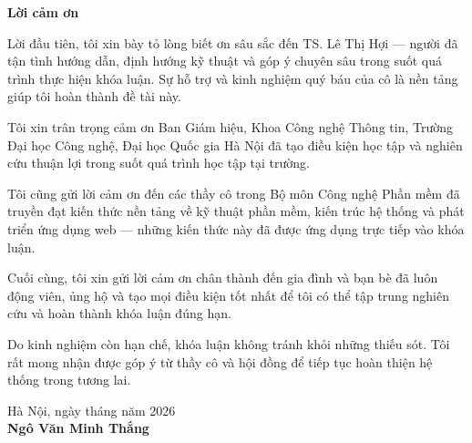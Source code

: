 \begin{center}
\textbf{\large{Lời cảm ơn}}
\end{center}

Lời đầu tiên, tôi xin bày tỏ lòng biết ơn sâu sắc đến TS. Lê Thị Hợi — người đã tận tình hướng dẫn, định hướng kỹ thuật và góp ý chuyên sâu trong suốt quá trình thực hiện khóa luận. Sự hỗ trợ và kinh nghiệm quý báu của cô là nền tảng giúp tôi hoàn thành đề tài này.

Tôi xin trân trọng cảm ơn Ban Giám hiệu, Khoa Công nghệ Thông tin, Trường Đại học Công nghệ, Đại học Quốc gia Hà Nội đã tạo điều kiện học tập và nghiên cứu thuận lợi trong suốt quá trình học tập tại trường.

Tôi cũng gửi lời cảm ơn đến các thầy cô trong Bộ môn Công nghệ Phần mềm đã truyền đạt kiến thức nền tảng về kỹ thuật phần mềm, kiến trúc hệ thống và phát triển ứng dụng web — những kiến thức này đã được ứng dụng trực tiếp vào khóa luận.

Cuối cùng, tôi xin gửi lời cảm ơn chân thành đến gia đình và bạn bè đã luôn động viên, ủng hộ và tạo mọi điều kiện tốt nhất để tôi có thể tập trung nghiên cứu và hoàn thành khóa luận đúng hạn.

Do kinh nghiệm còn hạn chế, khóa luận không tránh khỏi những thiếu sót. Tôi rất mong nhận được góp ý từ thầy cô và hội đồng để tiếp tục hoàn thiện hệ thống trong tương lai.

\begin{flushright}
Hà Nội, ngày \hspace{0.5cm} tháng \hspace{0.5cm} năm 2026\\[0.3cm]
\textbf{Ngô Văn Minh Thắng}
\end{flushright}
